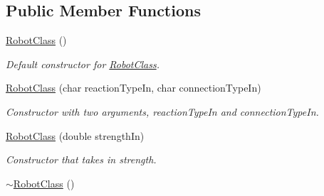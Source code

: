 \subsection*{Public Member Functions}
\begin{DoxyCompactItemize}
\item 
\hyperlink{classRobotClass_a7125604039c2a4b39e34e4354bd4ce19}{Robot\-Class} ()
\begin{DoxyCompactList}\small\item\em Default constructor for \hyperlink{classRobotClass}{Robot\-Class}. \end{DoxyCompactList}\item 
\hyperlink{classRobotClass_a56480a1dfd55d883563042eea3762212}{Robot\-Class} (char reaction\-Type\-In, char connection\-Type\-In)
\begin{DoxyCompactList}\small\item\em Constructor with two arguments, reaction\-Type\-In and connection\-Type\-In. \end{DoxyCompactList}\item 
\hyperlink{classRobotClass_a987480b493b3b7a0ce7f322d8eb02597}{Robot\-Class} (double strength\-In)
\begin{DoxyCompactList}\small\item\em Constructor that takes in strength. \end{DoxyCompactList}\item 
\hypertarget{classRobotClass_a7d7725737f146f85ed7ceeae7f300e9e}{\hyperlink{classRobotClass_a7d7725737f146f85ed7ceeae7f300e9e}{$\sim$\-Robot\-Class} ()}\label{classRobotClass_a7d7725737f146f85ed7ceeae7f300e9e}


\end{DoxyCompactItemize}
